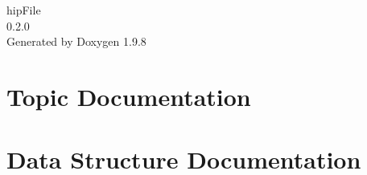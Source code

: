 \documentclass[twoside]{book}
\newcommand{\+}{\discretionary{\mbox{\scriptsize$\hookleftarrow$}}{}{}}
\newcommand{\clearemptydoublepage}{%
    \newpage{\pagestyle{empty}\cleardoublepage}%
  }
\begin{document}
  \raggedbottom
    \hypersetup{pageanchor=false,
                bookmarksnumbered=true,
                pdfencoding=unicode
               }
  \begin{titlepage}
  \vspace*{7cm}
  \begin{center}%
  {\Large hip\+File}\\
  [1ex]\large 0.\+2.\+0 \\
  \vspace*{1cm}
  {\large Generated by Doxygen 1.9.8}\\
  \end{center}
  \end{titlepage}
  \clearemptydoublepage
  \tableofcontents
  \clearemptydoublepage
  \hypersetup{pageanchor=true}

\chapter{Topic Documentation}







\chapter{Data Structure Documentation}







  \backmatter
  \newpage
  \clearemptydoublepage
  \printindex
\end{document}
